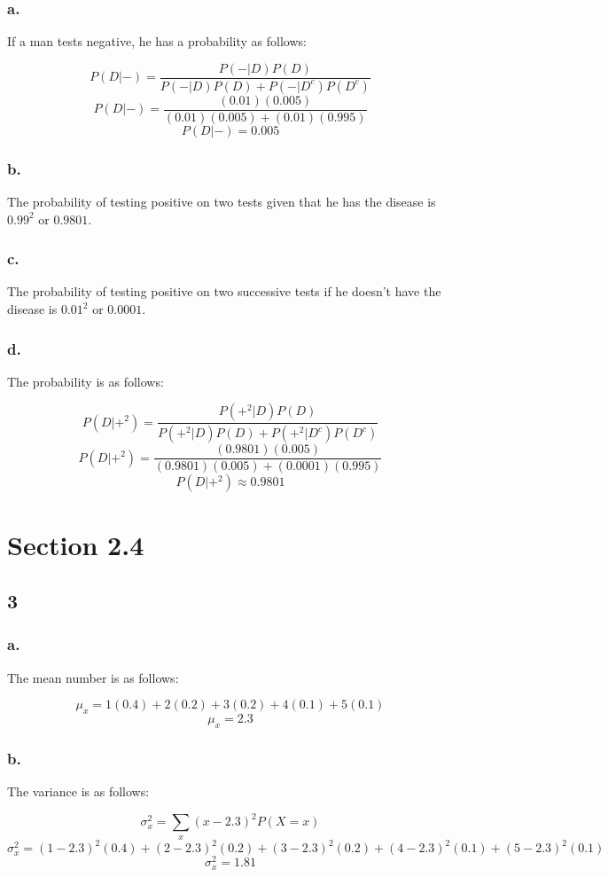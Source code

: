 \documentclass[11pt]{article}
\begin{document}
\subsubsection{a.}
If a man tests negative, he has a probability as follows:

\[ P(D|-) = \frac{P(-|D)P(D)}{P(-|D)P(D)+P(-|D^c)P(D^c)} \]
\[ P(D|-) = \frac{(0.01)(0.005)}{(0.01)(0.005) + (0.01)(0.995)} \]
\[ P(D|-) = 0.005 \]

\subsubsection{b.}
The probability of testing positive on two tests given that he has the disease
is $0.99^2$ or $0.9801$.

\subsubsection{c.}
The probability of testing positive on two successive tests if he doesn't have
the disease is $0.01^2$ or $0.0001$. 

\subsubsection{d.}
The probability is as follows:

\[ P(D|+^2) = \frac{P(+^2|D)P(D)}{P(+^2|D)P(D)+P(+^2|D^c)P(D^c)} \]
\[ P(D|+^2) = \frac{(0.9801)(0.005)}{(0.9801)(0.005)+(0.0001)(0.995)} \]
\[ P(D|+^2) \approx 0.9801  \]

\section{Section 2.4}
\subsection{3}
\subsubsection{a.}
The mean number is as follows:

\[ \mu_x = 1(0.4)+2(0.2)+3(0.2)+4(0.1)+5(0.1) \]
\[ \mu_x = 2.3 \]

\subsubsection{b.}
The variance is as follows:

\[ \sigma^2_x = \sum_x (x-2.3)^2 P(X=x) \]
\[ \sigma^2_x = (1-2.3)^2 (0.4) + (2-2.3)^2(0.2) + (3-2.3)^2(0.2) +
                (4-2.3)^2(0.1) + (5-2.3)^2(0.1) \]
\[ \sigma^2_x = 1.81 \]
\end{document}
